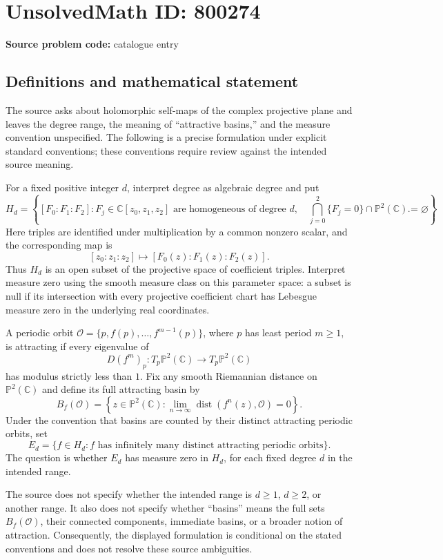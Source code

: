 \documentclass[11pt]{article}
\newcommand{\C}{\mathbb{C}}
\newcommand{\PP}{\mathbb{P}}
\begin{document}
\section*{UnsolvedMath ID: 800274}
\textbf{Source problem code:} catalogue entry
\subsection{Definitions and mathematical statement}
The source asks about holomorphic self-maps of the complex projective plane and leaves the degree range, the meaning of ``attractive basins,'' and the measure convention unspecified. The following is a precise formulation under explicit standard conventions; these conventions require review against the intended source meaning.

For a fixed positive integer \(d\), interpret degree as algebraic degree and put
\[
H_d=\left\{[F_0:F_1:F_2]: F_j\in\C[z_0,z_1,z_2]\text{ are homogeneous of degree }d,\quad \bigcap_{j=0}^2\{F_j=0\}\cap\PP^2(\C)=\varnothing\right\}.
\]
Here triples are identified under multiplication by a common nonzero scalar, and the corresponding map is
\[
[z_0:z_1:z_2]\longmapsto[F_0(z):F_1(z):F_2(z)].
\]
Thus \(H_d\) is an open subset of the projective space of coefficient triples. Interpret measure zero using the smooth measure class on this parameter space: a subset is null if its intersection with every projective coefficient chart has Lebesgue measure zero in the underlying real coordinates.

A periodic orbit \(\mathcal O=\{p,f(p),\ldots,f^{m-1}(p)\}\), where \(p\) has least period \(m\geq1\), is attracting if every eigenvalue of
\[
D(f^m)_p:T_p\PP^2(\C)\longrightarrow T_p\PP^2(\C)
\]
has modulus strictly less than \(1\). Fix any smooth Riemannian distance on \(\PP^2(\C)\) and define its full attracting basin by
\[
B_f(\mathcal O)=\left\{z\in\PP^2(\C):\lim_{n\to\infty}\operatorname{dist}(f^n(z),\mathcal O)=0\right\}.
\]
Under the convention that basins are counted by their distinct attracting periodic orbits, set
\[
E_d=\{f\in H_d: f\text{ has infinitely many distinct attracting periodic orbits}\}.
\]
The question is whether \(E_d\) has measure zero in \(H_d\), for each fixed degree \(d\) in the intended range.

The source does not specify whether the intended range is \(d\geq1\), \(d\geq2\), or another range. It also does not specify whether ``basins'' means the full sets \(B_f(\mathcal O)\), their connected components, immediate basins, or a broader notion of attraction. Consequently, the displayed formulation is conditional on the stated conventions and does not resolve these source ambiguities.
\end{document}
